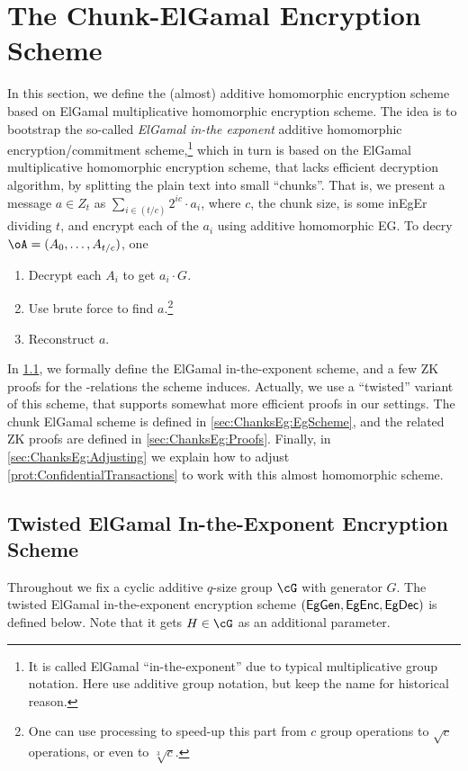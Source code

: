 \section{The Chunk-ElGamal  Encryption Scheme}\label{sec:ChanksEg}
In this section, we define the  (almost) additive homomorphic encryption scheme based on ElGamal multiplicative  homomorphic encryption scheme.  
The idea is to bootstrap the so-called   \textit{ElGamal in-the exponent}   additive homomorphic encryption/commitment  scheme,\footnote{It is called ElGamal ``in-the-exponent'' due to typical multiplicative group notation. Here use additive group notation, but keep the name for historical reason.}  which in turn is based on the  ElGamal multiplicative  homomorphic encryption scheme, that lacks efficient decryption algorithm, by splitting the plain text into small ``chunks''. That  is, we present a message $a\in Z_t$ as $\sum_{i \in (t/c)}   2^{i c} \cdot a_i$, where $c$, the chunk size, is  some inEgEr  dividing $t$, and encrypt each of the $a_i$ using    additive homomorphic EG. To decry $\oA= (A_0,\ldots,A_{t/c})$, one  
\begin{enumerate}
	\item Decrypt   each $A_i$ to get $a_i  \cdot G$.
	\item Use brute force to find $a$.\footnote{One can use    processing to speed-up this part from $c$ group operations to $\sqrt{c}$  operations, or even  to   $\sqrt[3]{c}$.}
	
	\item Reconstruct $a$.
\end{enumerate}
In \cref{sec:ChanksEg:Eg}, we formally define the  ElGamal in-the-exponent scheme, and a few ZK proofs for the \NP-relations the scheme induces. Actually, we use a ``twisted'' variant of this scheme, that supports somewhat more efficient proofs in our settings.   The chunk ElGamal  scheme is defined in \cref{sec:ChanksEg:EgScheme}, and the related ZK proofs are defined in \cref{sec:ChanksEg:Proofs}. Finally, in \cref{sec:ChanksEg:Adjusting} we explain  how to adjust \cref{prot:ConfidentialTransactions} to work with this almost homomorphic scheme.

\subsection{Twisted ElGamal In-the-Exponent Encryption Scheme}\label{sec:ChanksEg:Eg}
Throughout we fix a cyclic  additive $q$-size group $\cG$ with generator $G$. The  twisted ElGamal in-the-exponent encryption scheme $(\mathsf{EgGen},\mathsf{EgEnc},\mathsf{EgDec})$ is defined below. Note that it  gets  $H\in \cG$ as an  additional parameter.

